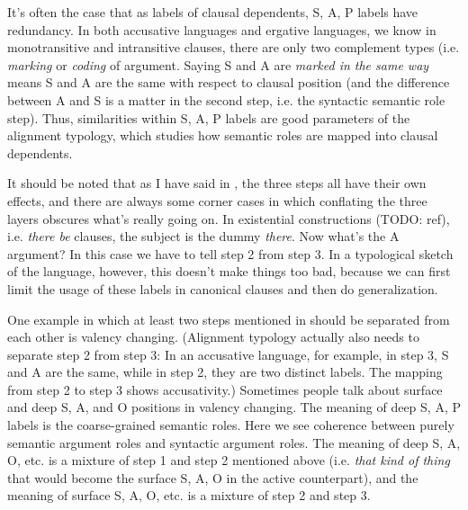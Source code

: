\documentclass[UTF8, a4paper, oneside, scheme=plain]{ctexrep}
\newcommand*{\term}[1]{\emph{#1}}
\newcommand{\corpus}[1]{\emph{#1}}
\begin{document}
It's often the case that as labels of clausal dependents, 
S, A, P labels have redundancy.
In both accusative languages and ergative languages, 
we know in monotransitive and intransitive clauses,
there are only two complement types (i.e. \term{marking} or \term{coding} of argument.
Saying S and A are \term{marked in the same way} 
means S and A are the same with respect to clausal position
(and the difference between A and S is a matter in the second step,
i.e. the syntactic semantic role step).
Thus, similarities within S, A, P labels are good parameters of the alignment typology,
which studies how semantic roles are mapped into clausal dependents.

It should be noted that as I have said in ,
the three steps all have their own effects,
and there are always some corner cases 
in which conflating the three layers obscures what's really going on.
In existential constructions (TODO: ref), i.e. \corpus{there be} clauses,  
the subject is the dummy \corpus{there}.
Now what's the A argument?
In this case we have to tell step 2 from step 3.
In a typological sketch of the language, however,
this doesn't make things too bad,
because we can first limit the usage of these labels in canonical clauses
and then do generalization.

One example in which at least two steps mentioned in 
should be separated from each other 
is valency changing.
(Alignment typology actually also needs to separate step 2 from step 3:
In an accusative language, for example,
in step 3, S and A are the same,
while in step 2, they are two distinct labels.
The mapping from step 2 to step 3 shows accusativity.)
Sometimes people talk about surface and deep S, A, and O positions in valency changing.
The meaning of deep S, A, P labels is
the coarse-grained semantic roles.
Here we see coherence between purely semantic argument roles and 
syntactic argument roles.
The meaning of deep S, A, O, etc. is a mixture of step 1 and step 2 mentioned above
(i.e. \emph{that kind of thing} that would become the surface S, A, O in the active counterpart),
and the meaning of surface S, A, O, etc. is a mixture of step 2 and step 3.
\end{document}
